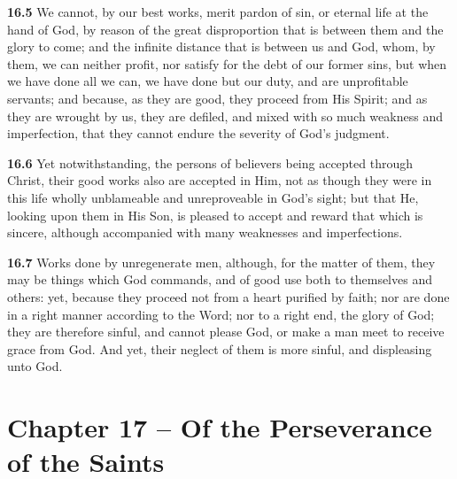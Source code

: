 \par\textbf{16.5} We cannot, by our best works, merit pardon of sin, or eternal life at the hand of God, by reason of the great disproportion that is between them and the glory to come; and the infinite distance that is between us and God, whom, by them, we can neither profit, nor satisfy for the debt of our former sins, but when we have done all we can, we have done but our duty, and are unprofitable servants; and because, as they are good, they proceed from His Spirit; and as they are wrought by us, they are defiled, and mixed with so much weakness and imperfection, that they cannot endure the severity of God's judgment.    

\par\textbf{16.6} Yet notwithstanding, the persons of believers being accepted through Christ, their good works also are accepted in Him, not as though they were in this life wholly unblameable and unreproveable in God's sight; but that He, looking upon them in His Son, is pleased to accept and reward that which is sincere, although accompanied with many weaknesses and imperfections.   

\par\textbf{16.7} Works done by unregenerate men, although, for the matter of them, they may be things which God commands, and of good use both to themselves and others: yet, because they proceed not from a heart purified by faith; nor are done in a right manner according to the Word; nor to a right end, the glory of God; they are therefore sinful, and cannot please God, or make a man meet to receive grace from God. And yet, their neglect of them is more sinful, and displeasing unto God.  

\section{Chapter 17 -- Of the Perseverance of the Saints}


